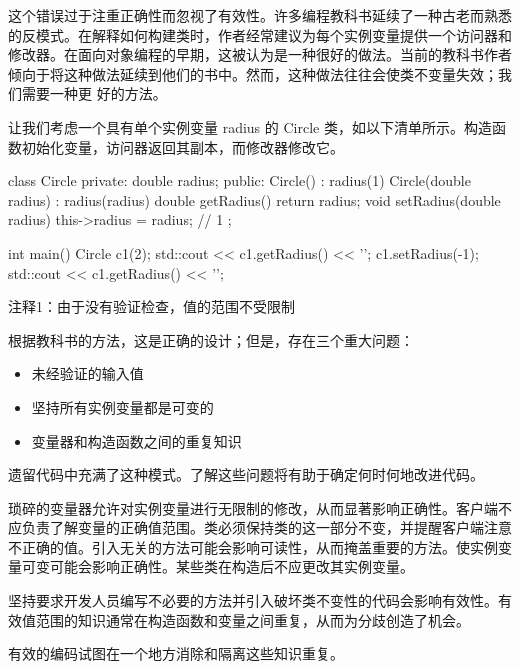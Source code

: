 这个错误过于注重正确性而忽视了有效性。许多编程教科书延续了一种古老而熟悉的反模式。在解释如何构建类时，作者经常建议为每个实例变量提供一个访问器和修改器。在面向对象编程的早期，这被认为是一种很好的做法。当前的教科书作者倾向于将这种做法延续到他们的书中。然而，这种做法往往会使类不变量失效；我们需要一种更 好的方法。


让我们考虑一个具有单个实例变量 radius 的 Circle 类，如以下清单所示。构造函数初始化变量，访问器返回其副本，而修改器修改它。


\begin{cpp}
class Circle {
private:
  double radius;
public:
  Circle() : radius(1) {}
  Circle(double radius) : radius(radius) {}
  double getRadius() { return radius; }
  void setRadius(double radius) { this->radius = radius; } // 1
};

int main() {
  Circle c1(2);
  std::cout << c1.getRadius() << '\n';
  c1.setRadius(-1);
  std::cout << c1.getRadius() << '\n';
}
\end{cpp}

{\footnotesize
注释1：由于没有验证检查，值的范围不受限制
}

根据教科书的方法，这是正确的设计；但是，存在三个重大问题：

\begin{itemize}
\item
未经验证的输入值

\item
坚持所有实例变量都是可变的

\item
变量器和构造函数之间的重复知识
\end{itemize}

遗留代码中充满了这种模式。了解这些问题将有助于确定何时何地改进代码。

琐碎的变量器允许对实例变量进行无限制的修改，从而显著影响正确性。客户端不应负责了解变量的正确值范围。类必须保持类的这一部分不变，并提醒客户端注意不正确的值。引入无关的方法可能会影响可读性，从而掩盖重要的方法。使实例变量可变可能会影响正确性。某些类在构造后不应更改其实例变量。

坚持要求开发人员编写不必要的方法并引入破坏类不变性的代码会影响有效性。有效值范围的知识通常在构造函数和变量之间重复，从而为分歧创造了机会。

有效的编码试图在一个地方消除和隔离这些知识重复。


